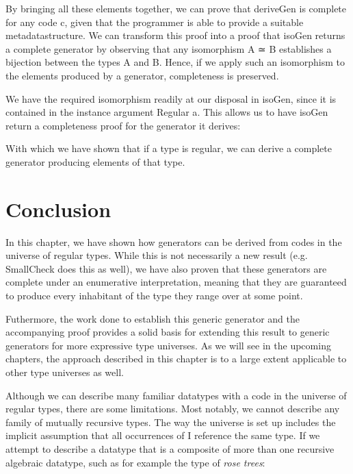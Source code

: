 \documentclass[a4paper,msc,twosized=semi]{uustthesis}
\let\oldemph\emph
\renewcommand\emph[1]{{\large\oldemph{#1}}}
\newcommand{\agda}[1]{{\agdafontinline\color{agdacolor}#1}}
\newcommand{\includeagda}[2]{\vspace*{-0.25cm}\begin{center}{\fontsize{12}{14}\agdafont\ExecuteMetaData[../src/chap0#1/latex/code.tex]{#2}}\end{center}\vspace*{-0.25cm}}
\begin{document}
  By bringing all these elements together, we can prove that \agda{deriveGen} is complete 
  for any code \agda{c}, given that the programmer is able to provide a suitable 
  metadatastructure. We can transform this proof into a proof that \agda{isoGen} returns a 
  complete generator by observing that any isomorphism \agda{A ≃ B} establishes a bijection 
  between the types \agda{A} and \agda{B}. Hence, if we apply such an isomorphism to the 
  elements produced by a generator, completeness is preserved. 

  We have the required isomorphism readily at our disposal in \agda{isoGen}, since it is 
  contained in the instance argument \agda{Regular a}. This allows us to have \agda{isoGen} 
  return a completeness proof for the generator it derives: 

\includeagda{5}{isogenproven}

  With which we have shown that if a type is regular, we can derive a complete 
  generator producing elements of that type. 

\section*{Conclusion}

  In this chapter, we have shown how generators can be derived from codes in the 
  universe of regular types. While this is not necessarily a new result (e.g. 
  SmallCheck does this as well), we have also proven that these generators are 
  complete under an enumerative interpretation, meaning that they are guaranteed to 
  produce every inhabitant of the type they range over at some point. 

  Futhermore, the work done to establish this generic generator and the accompanying 
  proof provides a solid basis for extending this result to generic generators for 
  more expressive type universes. As we will see in the upcoming chapters, the 
  approach described in this chapter is to a large extent applicable to other type 
  universes as well. 

  Although we can describe many familiar datatypes with a code in the universe of 
  regular types, there are some limitations. Most notably, we cannot describe any 
  family of mutually recursive types. The way the universe is set up includes the 
  implicit assumption that all occurrences of \agda{I} reference the same type. If we 
  attempt to describe a datatype that is a composite of more than one recursive 
  algebraic datatype, such as for example the type of \emph{rose trees}: 
\end{document}
